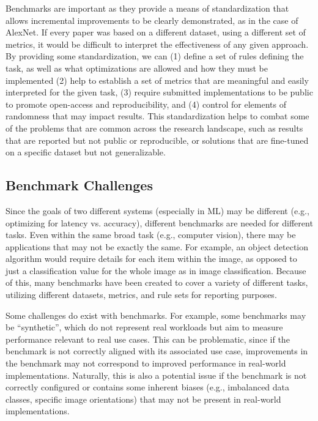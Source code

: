 {{{{{{{{    Benchmarks are important as they provide a means of standardization that allows incremental improvements to be clearly demonstrated, as in the case of AlexNet. If every paper was based on a different dataset, using a different set of metrics, it would be difficult to interpret the effectiveness of any given approach. By providing some standardization, we can (1) define a set of rules defining the task, as well as what optimizations are allowed and how they must be implemented (2) help to establish a set of metrics that are meaningful and easily interpreted for the given task, (3) require submitted implementations to be public to promote open-access and reproducibility, and (4) control for elements of randomness that may impact results. This standardization helps to combat some of the problems that are common across the research landscape, such as results that are reported but not public or reproducible, or solutions that are fine-tuned on a specific dataset but not generalizable.
    
    \subsection{Benchmark Challenges}
    
    Since the goals of two different systems (especially in ML) may be different (e.g., optimizing for latency vs. accuracy), different benchmarks are needed for different tasks. Even within the same broad task (e.g., computer vision), there may be applications that may not be exactly the same. For example, an object detection algorithm would require details for each item within the image, as opposed to just a classification value for the whole image as in image classification. Because of this, many benchmarks have been created to cover a variety of different tasks, utilizing different datasets, metrics, and rule sets for reporting purposes.
    
    Some challenges do exist with benchmarks. For example, some benchmarks may be “synthetic”, which do not represent real workloads but aim to measure performance relevant to real use cases. This can be problematic, since if the benchmark is not correctly aligned with its associated use case, improvements in the benchmark may not correspond to improved performance in real-world implementations. Naturally, this is also a potential issue if the benchmark is not correctly configured or contains some inherent biases (e.g., imbalanced data classes, specific image orientations) that may not be present in real-world implementations.
    
}}}}}}}}
